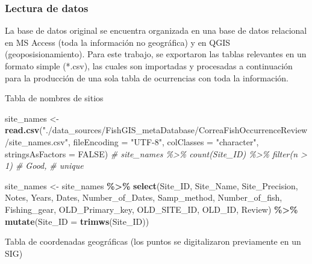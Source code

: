 \documentclass[sn-apa,pdflatex]{sn-jnl}
\newenvironment{Shaded}{\begin{snugshade}}{\end{snugshade}}
\newcommand{\AttributeTok}[1]{\textcolor[rgb]{0.13,0.29,0.53}{#1}}
\newcommand{\CommentTok}[1]{\textcolor[rgb]{0.56,0.35,0.01}{\textit{#1}}}
\newcommand{\ConstantTok}[1]{\textcolor[rgb]{0.56,0.35,0.01}{#1}}
\newcommand{\FunctionTok}[1]{\textcolor[rgb]{0.13,0.29,0.53}{\textbf{#1}}}
\newcommand{\NormalTok}[1]{#1}
\newcommand{\OtherTok}[1]{\textcolor[rgb]{0.56,0.35,0.01}{#1}}
\newcommand{\SpecialCharTok}[1]{\textcolor[rgb]{0.81,0.36,0.00}{\textbf{#1}}}
\newcommand{\StringTok}[1]{\textcolor[rgb]{0.31,0.60,0.02}{#1}}
\begin{document}
\subsubsection{Lectura de datos}\label{lectura-de-datos-1}

La base de datos original se encuentra organizada en una base de datos
relacional en MS Access (toda la información no geográfica) y en QGIS
(geoposisionamiento). Para este trabajo, se exportaron las tablas
relevantes en un formato simple (*.csv), las cuales son importadas y
procesadas a continuación para la producción de una sola tabla de
ocurrencias con toda la información.

Tabla de nombres de sitios

\begin{Shaded}
\begin{Highlighting}[]
\NormalTok{site\_names }\OtherTok{\textless{}{-}} \FunctionTok{read.csv}\NormalTok{(}\StringTok{"./data\_sources/FishGIS\_metaDatabase/CorreaFishOccurrenceReview/site\_names.csv"}\NormalTok{,}
    \AttributeTok{fileEncoding =} \StringTok{"UTF{-}8"}\NormalTok{, }\AttributeTok{colClasses =} \StringTok{"character"}\NormalTok{, }\AttributeTok{stringsAsFactors =} \ConstantTok{FALSE}\NormalTok{)}
\CommentTok{\# site\_names \%\textgreater{}\% count(Site\_ID) \%\textgreater{}\% filter(n \textgreater{} 1) \# Good,}
\CommentTok{\# unique}

\NormalTok{site\_names }\OtherTok{\textless{}{-}}\NormalTok{ site\_names }\SpecialCharTok{\%\textgreater{}\%}
    \FunctionTok{select}\NormalTok{(Site\_ID, Site\_Name, Site\_Precision, Notes, Years,}
\NormalTok{        Dates, Number\_of\_Dates, Samp\_method, Number\_of\_fish,}
\NormalTok{        Fishing\_gear, OLD\_Primary\_key, OLD\_SITE\_ID, OLD\_ID, Review) }\SpecialCharTok{\%\textgreater{}\%}
    \FunctionTok{mutate}\NormalTok{(}\AttributeTok{Site\_ID =} \FunctionTok{trimws}\NormalTok{(Site\_ID))}
\end{Highlighting}
\end{Shaded}

Tabla de coordenadas geográficas (los puntos se digitalizaron
previamente en un SIG)
\end{document}
